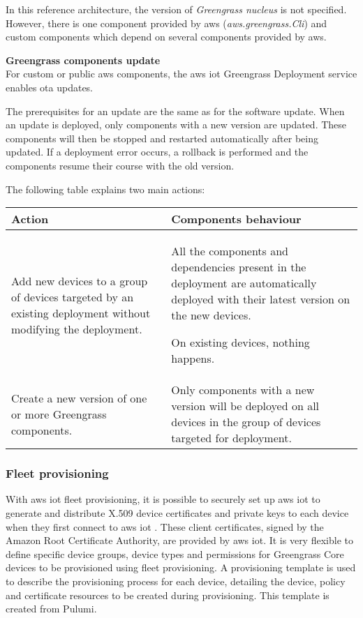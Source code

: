 In this reference architecture, the version of \textit{Greengrass nucleus} is not specified. However, there is one component provided by \gls{aws} (\textit{aws.greengrass.Cli}) and custom components which depend on several components provided by \gls{aws}.

\textbf{Greengrass components update}\\
For custom or public \gls{aws} components, the \gls{aws} \acrshort{iot} Greengrass Deployment service enables \acrshort{ota} updates.

The prerequisites for an update are the same as for the software update. When an update is deployed, only components with a new version are updated. These components will then be stopped and restarted automatically after being updated. If a deployment error occurs, a rollback is performed and the components resume their course with the old version.

The following table explains two main actions:

\begin{tabularx}{1\textwidth} { 
    | >{\raggedright\arraybackslash}X
    | >{\raggedright\arraybackslash}X | }
    \hline
    \rowcolor{lightgray}
    Action              & Components behaviour \\ \hline
    Add new devices to a group of devices targeted by an existing deployment without modifying the deployment.
    & All the components and dependencies present in the deployment are automatically deployed with their latest version on the new devices.
    
    On existing devices, nothing happens.\\
    \hline
    Create a new version of one or more Greengrass components.
    & Only components with a new version will be deployed on all devices in the group of devices targeted for deployment. \\
    \hline
\end{tabularx}

\subsubsection{Fleet \gls{provisioning}}
With \gls{aws} \acrshort{iot} fleet \gls{provisioning}, it is possible to securely set up \gls{aws} \acrshort{iot} to generate and distribute X.509 device certificates and private keys to each device when they first connect to \gls{aws} \acrshort{iot} \cite{aws_iot_greengrass_fleet}. These client certificates, signed by the Amazon Root Certificate Authority, are provided by \gls{aws} \acrshort{iot}. It is very flexible to define specific device groups, device types and permissions for Greengrass Core devices to be provisioned using fleet \gls{provisioning}. A \gls{provisioning} template is used to describe the \gls{provisioning} process for each device, detailing the device, policy and certificate resources to be created during \gls{provisioning}. This template is created from Pulumi.

